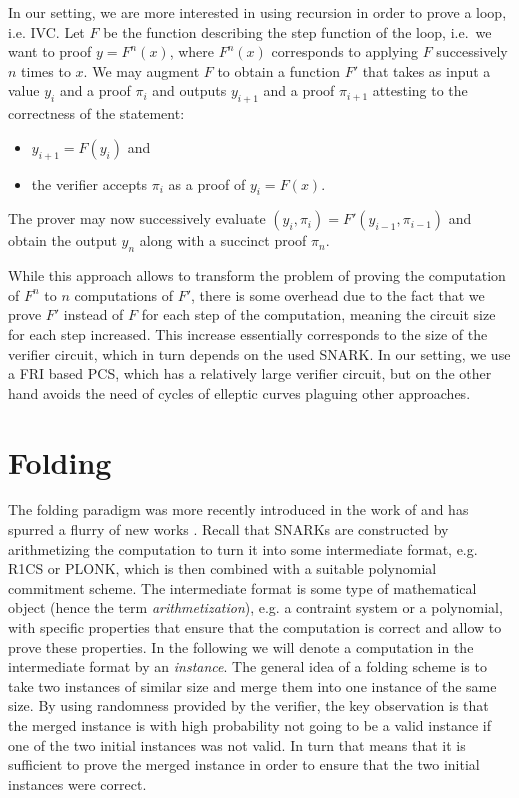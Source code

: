 \documentclass{zamarep}
\begin{document}
In our setting, we are more interested in using recursion in order to prove a loop, i.e. IVC. Let $F$ be the function describing the step function of the loop, i.e.\ we want to proof $y = F^{n}(x)$, where $F^{n}(x)$ corresponds to applying $F$ successively $n$ times to $x$. We may augment $F$ to obtain a function $F'$ that takes as input a value $y_i$ and a proof $\pi_i$ and outputs $y_{i+1}$ and a proof $\pi_{i+1}$ attesting to the correctness of the statement:
\begin{itemize}
\item $y_{i+1} = F(y_i)$ and
\item the verifier accepts $\pi_i$ as a proof of $y_{i} = F(x)$.
\end{itemize}
The prover may now successively evaluate $(y_i, \pi_i) = F'(y_{i-1}, \pi_{i-1})$ and obtain the output $y_{n}$ along with a succinct proof $\pi_{n}$.

While this approach allows to transform the problem of proving the computation of $F^n$ to $n$ computations of $F'$, there is some overhead due to the fact that we prove $F'$ instead of $F$ for each step of the computation, meaning the circuit size for each step increased. This increase essentially corresponds to the size of the verifier circuit, which in turn depends on the used SNARK. In our setting, we use a FRI based PCS, which has a relatively large verifier circuit, but on the other hand avoids the need of cycles of elleptic curves plaguing other approaches.


\section{Folding}
\label{sec:fold}

The folding paradigm was more recently introduced in the work of \cite{EPRINT:BowGriHop19} and has spurred a flurry of new works \cite{C:KotSetTzi22,EPRINT:KotSet22,cryptoeprint:2023/620,C:BCLMS21,TCC:BCMS20,sangria}. Recall that SNARKs are constructed by arithmetizing the computation to turn it into some intermediate format, e.g. R1CS or PLONK, which is then combined with a suitable polynomial commitment scheme. The intermediate format is some type of mathematical object (hence the term \emph{arithmetization}), e.g. a contraint system or a polynomial, with specific properties that ensure that the computation is correct and allow to prove these properties. In the following we will denote a computation in the intermediate format by an \emph{instance}. The general idea of a folding scheme is to take two instances of similar size and merge them into one instance of the same size. By using randomness provided by the verifier, the key observation is that the merged instance is with high probability not going to be a valid instance if one of the two initial instances was not valid. In turn that means that it is sufficient to prove the merged instance in order to ensure that the two initial instances were correct. 
\end{document}
